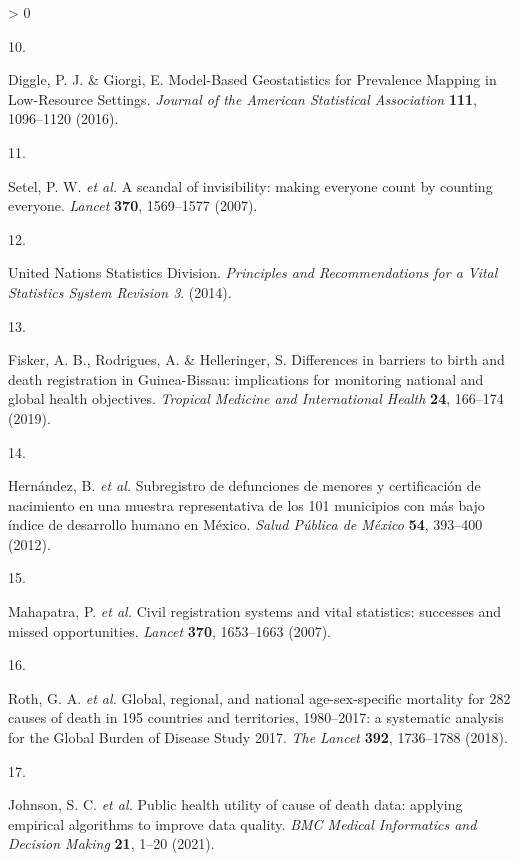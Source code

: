 \documentclass[
]{article}
\newlength{\cslhangindent}
\newlength{\csllabelwidth}
\newenvironment{CSLReferences}[2] %
 {%
  \setlength{\parindent}{0pt}
  \ifodd #1 \everypar{\setlength{\hangindent}{\cslhangindent}}\ignorespaces\fi
  \ifnum #2 > 0
  \setlength{\parskip}{#2\baselineskip}
  \fi
 }%
 {}
\newcommand{\CSLLeftMargin}[1]{\parbox[t]{\csllabelwidth}{#1}}
\newcommand{\CSLRightInline}[1]{\parbox[t]{\linewidth - \csllabelwidth}{#1}\break}
\begin{document}
\begin{CSLReferences}{0}{0}
\leavevmode\hypertarget{ref-Diggle2016}{}%
\CSLLeftMargin{10. }
\CSLRightInline{Diggle, P. J. \& Giorgi, E. {Model-Based Geostatistics for Prevalence Mapping in Low-Resource Settings}. \emph{Journal of the American Statistical Association} \textbf{111}, 1096--1120 (2016).}

\leavevmode\hypertarget{ref-Setel2007}{}%
\CSLLeftMargin{11. }
\CSLRightInline{Setel, P. W. \emph{et al.} {A scandal of invisibility: making everyone count by counting everyone}. \emph{Lancet} \textbf{370}, 1569--1577 (2007).}

\leavevmode\hypertarget{ref-UnitedNationsStatisticsDivision2014}{}%
\CSLLeftMargin{12. }
\CSLRightInline{United Nations Statistics Division. \emph{{Principles and Recommendations for a Vital Statistics System Revision 3}}. (2014).}

\leavevmode\hypertarget{ref-Fisker2019}{}%
\CSLLeftMargin{13. }
\CSLRightInline{Fisker, A. B., Rodrigues, A. \& Helleringer, S. {Differences in barriers to birth and death registration in Guinea-Bissau: implications for monitoring national and global health objectives}. \emph{Tropical Medicine and International Health} \textbf{24}, 166--174 (2019).}

\leavevmode\hypertarget{ref-Hernandez2012}{}%
\CSLLeftMargin{14. }
\CSLRightInline{Hernández, B. \emph{et al.} {Subregistro de defunciones de menores y certificaci{ó}n de nacimiento en una muestra representativa de los 101 municipios con m{á}s bajo {í}ndice de desarrollo humano en M{é}xico}. \emph{Salud P{ú}blica de M{é}xico} \textbf{54}, 393--400 (2012).}

\leavevmode\hypertarget{ref-Mahapatra2007}{}%
\CSLLeftMargin{15. }
\CSLRightInline{Mahapatra, P. \emph{et al.} {Civil registration systems and vital statistics: successes and missed opportunities}. \emph{Lancet} \textbf{370}, 1653--1663 (2007).}

\leavevmode\hypertarget{ref-Roth2018}{}%
\CSLLeftMargin{16. }
\CSLRightInline{Roth, G. A. \emph{et al.} {Global, regional, and national age-sex-specific mortality for 282 causes of death in 195 countries and territories, 1980--2017: a systematic analysis for the Global Burden of Disease Study 2017}. \emph{The Lancet} \textbf{392}, 1736--1788 (2018).}

\leavevmode\hypertarget{ref-Johnson2021}{}%
\CSLLeftMargin{17. }
\CSLRightInline{Johnson, S. C. \emph{et al.} {Public health utility of cause of death data: applying empirical algorithms to improve data quality}. \emph{BMC Medical Informatics and Decision Making} \textbf{21}, 1--20 (2021).}


\end{CSLReferences}
\end{document}
